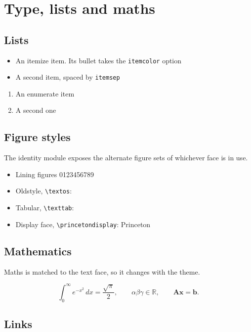 \documentclass[
  11pt,                   %
  class=article,          %
  theme=classic,          %
  titleformat=simple,     %
  columns=one,            %
  logo=running,           %
  logocolor=color,        %
  signature=engineering,  %
  fontset=auto,           %
  marginpos=left,         %
  itemcolor=pu-gray,      %
  itemsep=1ex,            %
  colorlinks=true,        %
  date=true,              %
  titledate=false,        %
  draft=false,            %
]{princeton}
\begin{document}
\blindtext

\section{Type, lists and maths}

\subsection{Lists}

\begin{itemize}
\item An itemize item. Its bullet takes the \texttt{itemcolor} option
\item A second item, spaced by \texttt{itemsep}
\end{itemize}

\begin{enumerate}
\item An enumerate item
\item A second one
\end{enumerate}

\subsection{Figure styles}

The identity module exposes the alternate figure sets of whichever face is in
use.

\begin{itemize}
\item Lining figures 0123456789
\item Oldstyle, \verb|\textos|: 
\item Tabular, \verb|\texttab|: 
\item Display face, \verb|\princetondisplay|: {\princetondisplay Princeton}
\end{itemize}

\subsection{Mathematics}

Maths is matched to the text face, so it changes with the theme.

\[
  \int_0^{\infty} e^{-x^2}\,dx = \frac{\sqrt{\pi}}{2},
  \qquad \alpha\beta\gamma \in \mathbb{R},
  \qquad \mathbf{A}\mathbf{x} = \mathbf{b}.
\]

\subsection{Links}
\end{document}

